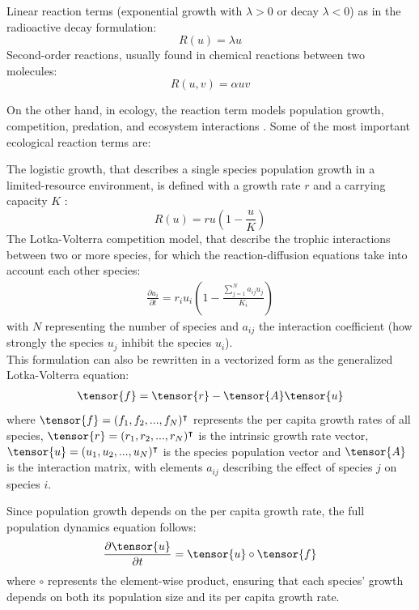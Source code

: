 \begin{Itemize}
    \Item{} Linear reaction terms (exponential growth with $\lambda > 0$ or decay $\lambda < 0$) as in the radioactive decay formulation:
    $$ R(u) = \lambda u $$
    \Item{} Second-order reactions, usually found in chemical reactions between two molecules:
    $$ R(u, v) = \alpha u v$$
\end{Itemize}

On the other hand, in ecology, the reaction term models population growth, competition, predation, and ecosystem interactions \cite{Brauer2012}. Some of the most important ecological reaction terms are:
\begin{Itemize}
    \Item{} The logistic growth, that describes a single species population growth in a limited-resource environment, is defined with a growth rate $r$ and a carrying capacity $K$ \cite{Verhulst1844}:
    $$ R(u) = r u \left( 1 - \frac{u}{K} \right)$$
    \Item{} The Lotka-Volterra competition model, that describe the trophic interactions between two or more species, for which the reaction-diffusion equations take into account each other species:
    \begin{align}
        \frac{\partial u_i}{\partial t} = r_i u_i \left( 1 - \frac{\sum_{j=1}^N a_{ij} u_j}{K_i} \right)
    \end{align}
    with $N$ representing the number of species and $a_{ij}$ the interaction coefficient (how strongly the species $u_j$ inhibit the species $u_i$). \\
    This formulation can also be rewritten in a vectorized form as the generalized Lotka-Volterra equation:
    \begin{align}
        \tensor{f} = \tensor{r} - \tensor{A} \tensor{u}
    \end{align}
    where $\tensor{f} = (f_1, f_2, ..., f_N)^\intercal$ represents the per capita growth rates of all species, $\tensor{r} = (r_1, r_2, ..., r_N)^\intercal$ is the intrinsic growth rate vector, $\tensor{u} = (u_1, u_2, ..., u_N)^\intercal$ is the species population vector and $\tensor{A}$ is the interaction matrix, with elements $a_{ij}$ describing the effect of species $j$ on species $i$.
    
    Since population growth depends on the per capita growth rate, the full population dynamics equation follows:
    \begin{align}
        \frac{\partial \tensor{u}}{\partial t} = \tensor{u} \circ \tensor{f}
    \end{align}
    where $\circ$ represents the element-wise product, ensuring that each species' growth depends on both its population size and its per capita growth rate.
\end{Itemize}


